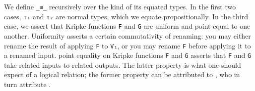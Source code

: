 \documentclass[authoryear, acmsmall, screen, review, nonacm]{acmart}
\begin{document}
\Ni We define \verb!_≋_! recursively over the kind of its equated types. In the first two cases, \verb!τ₁! and \verb!τ₂! are normal types, which we equate propositionally. In the third case, we assert that Kripke functions \verb!F! and \verb!G! are uniform and point-equal to one another. Uniformity asserts a certain commutativity of renaming: you may either rename the result of applying \verb!F! to \verb!V₁!, or you may rename \verb!F! before applying it to a renamed input. point equality on Kripke functions \verb!F! and \verb!G! asserts that \verb!F! and \verb!G! take related inputs to related outputs. The latter property is what one should expect of a logical relation; the former property can be attributed to \citet{ChapmanKNW19}, who in turn attribute \citet{AllaisBM13}. 

\begin{code}%
\>[0]\AgdaSpace{}%
\AgdaSymbol{\{}\AgdaSymbol{\}}\AgdaSpace{}%
\AgdaSymbol{\{}\AgdaSymbol{\}}\AgdaSpace{}%
\AgdaSymbol{\{}\AgdaSymbol{\}}\AgdaSpace{}%
\AgdaSpace{}%
\AgdaSymbol{=}\<%
\\
\>[0][@{}l@{\AgdaIndent{0}}]%
\>[2]\AgdaSpace{}%
\AgdaSymbol{\{}\AgdaSpace{}%
\AgdaSymbol{\}}\AgdaSpace{}%
\AgdaSymbol{(}\AgdaSpace{}%
\AgdaSymbol{:}\AgdaSpace{}%
\AgdaSpace{}%
\AgdaSpace{}%
\AgdaSymbol{)}\AgdaSpace{}%
\AgdaSymbol{(}\AgdaSpace{}%
\AgdaSymbol{:}\AgdaSpace{}%
\AgdaSpace{}%
\AgdaSpace{}%
\AgdaSymbol{)}\AgdaSpace{}%
\AgdaSymbol{(}\AgdaSpace{}%
\AgdaSpace{}%
\AgdaSymbol{:}\AgdaSpace{}%
\AgdaSpace{}%
\AgdaSpace{}%
\AgdaSymbol{)}\AgdaSpace{}%
\<%
\\
%
\>[2]\AgdaSpace{}%
\AgdaSpace{}%
\AgdaSpace{}%
\AgdaSpace{}%
\AgdaSymbol{(}\AgdaSpace{}%
\AgdaSpace{}%
\AgdaSymbol{(}\AgdaSpace{}%
\AgdaSpace{}%
\AgdaSymbol{))}\AgdaSpace{}%
\AgdaSpace{}%
\AgdaSymbol{(}\AgdaSpace{}%
\AgdaSpace{}%
\AgdaSpace{}%
\AgdaSpace{}%
\AgdaSymbol{(}\AgdaSpace{}%
\AgdaSpace{}%
\AgdaSymbol{))}\<%
\\

\end{code}
\end{document}
